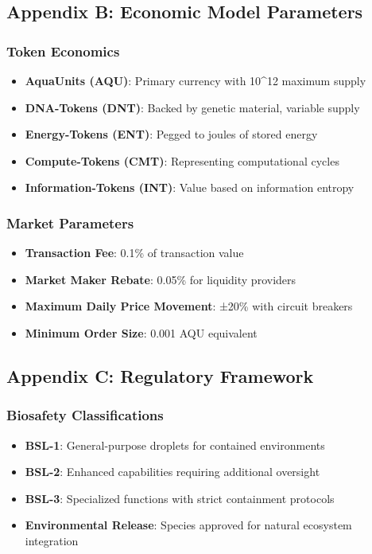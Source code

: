 \documentclass[11pt,a4paper]{article}
\begin{document}
\subsection{Appendix B: Economic Model Parameters}

\subsubsection{Token Economics}
\begin{itemize}
    \item \textbf{AquaUnits (AQU)}: Primary currency with 10\^{}12 maximum supply
    \item \textbf{DNA-Tokens (DNT)}: Backed by genetic material, variable supply
    \item \textbf{Energy-Tokens (ENT)}: Pegged to joules of stored energy
    \item \textbf{Compute-Tokens (CMT)}: Representing computational cycles
    \item \textbf{Information-Tokens (INT)}: Value based on information entropy
\end{itemize}

\subsubsection{Market Parameters}
\begin{itemize}
    \item \textbf{Transaction Fee}: 0.1\% of transaction value
    \item \textbf{Market Maker Rebate}: 0.05\% for liquidity providers
    \item \textbf{Maximum Daily Price Movement}: ±20\% with circuit breakers
    \item \textbf{Minimum Order Size}: 0.001 AQU equivalent
\end{itemize}

\subsection{Appendix C: Regulatory Framework}

\subsubsection{Biosafety Classifications}
\begin{itemize}
    \item \textbf{BSL-1}: General-purpose droplets for contained environments
    \item \textbf{BSL-2}: Enhanced capabilities requiring additional oversight
    \item \textbf{BSL-3}: Specialized functions with strict containment protocols
    \item \textbf{Environmental Release}: Species approved for natural ecosystem integration
\end{itemize}
\end{document}
